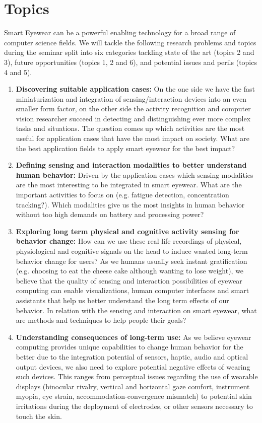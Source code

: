 \documentclass{sigchi-ext}
\begin{document}
\section{Topics}

Smart Eyewear can be a powerful enabling technology for a broad range of computer science fields. We will tackle the following research problems and topics during the seminar split into six categories tackling state of the art (topics 2 and 3), future opportunities (topics 1, 2 and 6), and potential issues and perils (topics 4 and 5).
\begin{enumerate}
  \item {\bf Discovering suitable application cases:} On the one side we have the fast miniaturization and integration of sensing/interaction devices into an even smaller form factor, on the other side the activity recognition  and computer vision researcher succeed in detecting and distinguishing ever more complex tasks and situations. The question comes up which activities are the most useful for application cases that have the most impact on society. What are the best application fields to apply smart eyewear for the best impact?
  \item {\bf Defining sensing and interaction modalities to better understand human behavior:} Driven by the application cases which sensing modalities are the most interesting to be integrated in smart eyewear. What are the important activities to focus on (e.g. fatigue detection, concentration tracking?). Which modalities give us the most insights in human behavior without too high demands on battery and processing power? 
  \item {\bf Exploring long term physical and cognitive activity sensing for behavior change:} How can we use these real life recordings of physical, physiological and cognitive signals on the head to induce wanted long-term behavior change for users? As we humans usually seek instant gratification (e.g. choosing to eat the cheese cake although wanting to lose weight), we believe that the quality of sensing and interaction possibilities of eyewear computing can enable visualizations, human computer interfaces and smart assistants that help us better understand the long term effects of our behavior. In relation with the sensing and interaction on smart eyewear, what are methods and techniques to help people their goals?
  \item {\bf Understanding consequences of long-term use:} As we believe eyewear computing provides unique capabilities to change human behavior for the better due to the integration potential of sensors, haptic, audio and optical output devices, we also need to explore potential negative effects of wearing such devices. This ranges from perceptual issues regarding the use of wearable displays (binocular rivalry, vertical and horizontal gaze comfort, instrument myopia, eye strain, accommodation-convergence mismatch) to potential skin irritations during the deployment of electrodes, or other sensors necessary to touch the skin. 

\end{enumerate}
\end{document}
